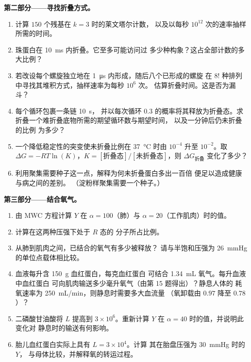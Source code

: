 \begin{problem}
\medskip
\noindent\textbf{第二部分——寻找折叠方式。}
\begin{enumerate}[resume]
  \item 计算 $150$ 个残基在 $k = 3$ 时的莱文塔尔计数，
        以及以每秒 $10^{12}$ 次的速率抽样所需的时间。
  \item 珠蛋白在 \qty{10}{ms} 内折叠。它至多可能访问过
        多少种构象？这占全部计数的多大比例？
  \item 若改设每个螺旋独立地在
        \qty{1}{\micro s} 内形成，随后八个已形成的螺旋
        在 $8!$ 种排列中寻找其堆积方式，抽样速率为每秒 $10^{6}$ 次。
        估算折叠时间。这是否为漏斗？
  \item {}每个循环包裹一条链 \qty{10}{s}，
        并以每次循环 $0.3$ 的概率将其释放为折叠态。求
        折叠一个难折叠底物所需的期望循环数与期望时间，
        以及一分钟后仍未折叠的比例
        为多少？
  \item 一个降低稳定性的突变使未折叠比例在
        \qty{37}{\celsius} 时由 $10^{-4}$ 升至 $10^{-2}$。取 $\Delta G =
        -RT\ln(K)$，$K = [\text{折叠态}]/[\text{未折叠态}]$，则
        $\Delta G_{\text{折叠}}$ 变化了多少？
  \item 利用聚集需要种子这一点，解释为何未折叠蛋白多出一百倍
        便足以造成健康与病之间的差别。
        （淀粉样聚集需要一个种子。）
\end{enumerate}

\medskip
\noindent\textbf{第三部分——结合氧气。}
\begin{enumerate}[resume]
  \item 由 MWC 方程计算 $Y$ 在 $\alpha = 100$（肺）与
        $\alpha = 20$（工作肌肉）时的值。
  \item 计算在这两种压强下处于 $R$ 态的
        分子所占比例。
  \item 从肺到肌肉之间，已结合的氧气有多少被释放？
        请与半饱和压强为
        \qty{26}{mmHg} 的单位点载体相比较。
  \item 血液每升含 \qty{150}{g} 血红蛋白，每克血红蛋白
        可结合 \qty{1.34}{mL} 氧气。每升血液中血红蛋白
        可向肌肉输送多少毫升氧气（由第 15 题得出）？静息人体的
        耗氧速率为 \qty{250}{mL/min}，则静息时需要多大血流量
        （氧卸载由 $0.97$ 降至
        $0.78$）？
  \item 二磷酸甘油酸将 $L$ 提高到 $3\times 10^{6}$。重新计算
        $Y$ 在 $\alpha = 40$ 时的值，并说明此变化对
        静息时的输送有何影响。
  \item 胎儿血红蛋白实际上具有 $L = 3\times 10^{4}$。计算
        其在胎盘压强为 \qty{30}{mmHg} 时的 $Y$，
        与母体比较，并解释氧的转运过程。
\end{enumerate}


\end{problem}

